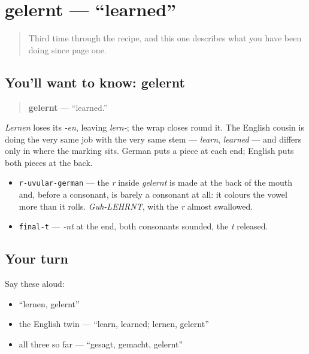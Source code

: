 \section[gelernt]{gelernt — \textquotedblleft{}learned\textquotedblright{}}

\label{lesson:GE-C15-gelernt}



\begin{quote}
Third time through the recipe, and this one describes what you have been doing since page one.
\end{quote}

\subsection*{You'll want to know: gelernt}
\begin{quote}
\textbf{gelernt} — \textquotedblleft{}learned.\textquotedblright{}
\end{quote}

\emph{Lernen} loses its \emph{-en}, leaving \emph{lern-}; the wrap closes round it. The English cousin is doing the very same job with the very same stem — \emph{learn}, \emph{learned} — and differs only in where the marking sits. German puts a piece at each end; English puts both pieces at the back.

\begin{sounds}
\begin{itemize}
\raggedright
  \item \texttt{r-uvular-german} — the \emph{r} inside \emph{gelernt} is made at the back of the mouth and, before a consonant, is barely a consonant at all: it colours the vowel more than it rolls. \emph{Guh-LEHRNT}, with the \emph{r} almost swallowed.
  \item \texttt{final-t} — \emph{-nt} at the end, both consonants sounded, the \emph{t} released.
\end{itemize}
\end{sounds}

\subsection*{Your turn}
Say these aloud:

\begin{itemize}
\raggedright
  \item \textquotedblleft{}lernen, gelernt\textquotedblright{}
  \item the English twin — \textquotedblleft{}learn, learned; lernen, gelernt\textquotedblright{}
  \item all three so far — \textquotedblleft{}gesagt, gemacht, gelernt\textquotedblright{}
\end{itemize}


